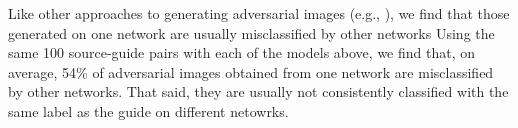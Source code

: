 \documentclass{article} %
\newcommand{\david}[1]{\textcolor{blue}{\textbf{[D: #1]}}}
\newcommand{\comment}[1]{}
\begin{document}

Like other approaches to generating adversarial images
(e.g., \cite{SzegedyElatICLR2014}), we find that those generated
on one network are usually misclassified by other networks
Using the same 100 source-guide pairs with each of the models above,
we find that, on average, 54\% of adversarial images obtained from one
network are misclassified by other networks.  That said, they are usually
not consistently classified with the same label as the guide on different
netowrks.

\end{document}
